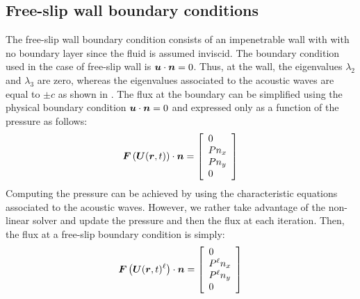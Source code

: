 \subsection{Free-slip wall boundary conditions} \label{sec:wall-bc}
The free-slip wall boundary condition consists of an impenetrable wall with with no boundary layer since the fluid is assumed inviscid. The boundary condition used in the case of free-slip wall is $\boldsymbol u \cdot \boldsymbol n = 0$. Thus, at the wall, the eigenvalues $\lambda_2$ and $\lambda_3$ are zero, whereas the eigenvalues associated to the acoustic waves are equal to $\pm c$ as shown in . The flux at the boundary can be simplified using the physical boundary condition $\boldsymbol u \cdot \boldsymbol n = 0$ and expressed only as a function of the pressure as follows:
%
\begin{equation}\label{eq:flux-wall-bc}
\boldsymbol F \left( \boldsymbol U(\boldsymbol r, t) \right) \cdot \boldsymbol n = 
\left[ 
\begin{array}{l}
0\\
P n_x \\
P n_y \\
0
\end{array}
\right]
\end{equation}
%
Computing the pressure can be achieved by using the characteristic equations associated to the acoustic waves. However, we rather take advantage of the non-linear solver and update the pressure and then the flux at each iteration. Then, the flux at a free-slip boundary condition is simply:
%
\begin{equation}\label{eq:flux-wall-bc-k}
\boldsymbol F \left( \boldsymbol U(\boldsymbol r, t)^\ell \right) \cdot \boldsymbol n = 
\left[ 
\begin{array}{l}
0\\
P^\ell n_x \\
P^\ell n_y \\
0
\end{array}
\right]
\end{equation}
%

